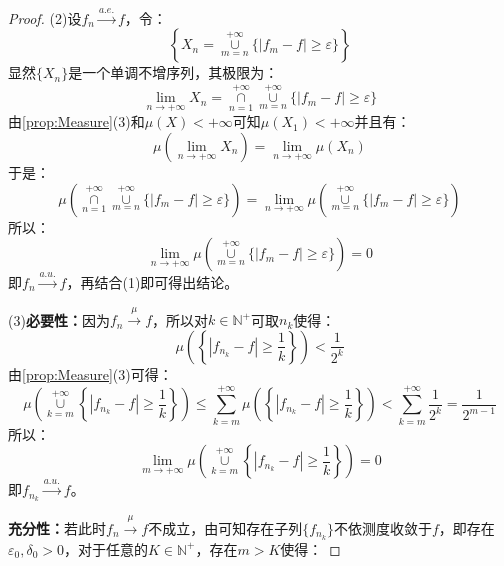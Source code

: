 \begin{proof}
	(2)设$f_n\overset{a.e.}{\longrightarrow}f$，令：
	\begin{equation*}
		\left\{X_n=\underset{m=n}{\overset{+\infty}{\cup}}\{|f_m-f|\geqslant\varepsilon\}\right\}
	\end{equation*}
	显然$\{X_n\}$是一个单调不增序列，其极限为：
	\begin{equation*}
		\lim_{n\to+\infty}X_n=\underset{n=1}{\overset{+\infty}{\cap}}\underset{m=n}{\overset{+\infty}{\cup}}\{|f_m-f|\geqslant\varepsilon\}
	\end{equation*}
	由\cref{prop:Measure}(3)和$\mu(X)<+\infty$可知$\mu(X_1)<+\infty$并且有：
	\begin{equation*}
		\mu\left(\lim_{n\to+\infty}X_n\right)=\lim_{n\to+\infty}\mu(X_n)
	\end{equation*}
	于是：
	\begin{equation*}
		\mu\left(\underset{n=1}{\overset{+\infty}{\cap}}\underset{m=n}{\overset{+\infty}{\cup}}\{|f_m-f|\geqslant\varepsilon\}\right)=\lim_{n\to+\infty}\mu\left(\underset{m=n}{\overset{+\infty}{\cup}}\{|f_m-f|\geqslant\varepsilon\}\right)
	\end{equation*}
	所以：
	\begin{equation*}
		\lim_{n\to+\infty}\mu\left(\underset{m=n}{\overset{+\infty}{\cup}}\{|f_m-f|\geqslant\varepsilon\}\right)=0
	\end{equation*}
	即$f_n\overset{a.u.}{\longrightarrow}f$，再结合(1)即可得出结论。\par
	(3)\textbf{必要性：}因为$f_n\overset{\mu}{\longrightarrow}f$，所以对$k\in\mathbb{N}^+$可取$n_k$使得：
	\begin{equation*}
		\mu\left(\left\{|f_{n_k}-f|\geqslant\frac{1}{k}\right\}\right)<\frac{1}{2^k}
	\end{equation*}
	由\cref{prop:Measure}(3)可得：
	\begin{equation*}
		\mu\left(\underset{k=m}{\overset{+\infty}{\cup}}\left\{|f_{n_k}-f|\geqslant\frac{1}{k}\right\}\right)\leqslant\sum_{k=m}^{+\infty}\mu\left(\left\{|f_{n_k}-f|\geqslant\frac{1}{k}\right\}\right)<\sum_{k=m}^{+\infty}\frac{1}{2^k}=\frac{1}{2^{m-1}}
	\end{equation*}
	所以：
	\begin{equation*}
		\lim_{m\to+\infty}\mu\left(\underset{k=m}{\overset{+\infty}{\cup}}\left\{|f_{n_k}-f|\geqslant\frac{1}{k}\right\}\right)=0
	\end{equation*}
	即$f_{n_k}\overset{a.u.}{\longrightarrow}f$。\par
	\textbf{充分性：}若此时$f_n\overset{\mu}{\longrightarrow}f$不成立，由可知存在子列$\{f_{n_k}\}$不依测度收敛于$f$，即存在$\varepsilon_0,\delta_0>0$，对于任意的$K\in\mathbb{N}^+$，存在$m>K$使得：

\end{proof}
